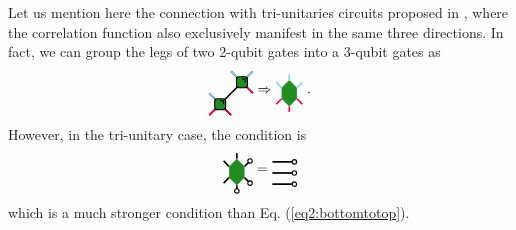 \documentclass[aps,prx,twocolumn,notitlepage,nofootinbib,nobalancelastpage]{revtex4-2}
\theoremstyle{break}
\newcommand{\1}{\mathbbm{1}}
\theoremstyle{plain}
\theoremstyle{plain}
\theoremstyle{plain}
\newcommand{\Wgategreen}[2]{
\draw[very thick] (#1-0.5, #2 +0.5) -- (#1+0.5,#2-0.5);
\draw[very thick] (#1-0.5,#2-0.5) -- (#1+0.5,#2+0.5);
\draw[ thick, fill=mygreen, rounded corners=2pt] (#1-0.25,#2+0.25) rectangle (#1+0.25,#2-0.25);
\draw[thick] (#1,#2+0.15) -- (#1+0.15,#2+0.15) -- (#1+0.15,#2);
}
\newcommand{\MYcircle}[2]{
\draw[thick, fill=white] (#1,#2) circle (0.1cm); }
\begin{document}
Let us mention here the connection with tri-unitaries circuits proposed in \cite{jonay2021triunitary}, where the correlation function also exclusively manifest in the same three directions. In fact, we can group the legs of two 2-qubit gates into a 3-qubit gates as
\begin{equation}
\begin{tikzpicture}[baseline=(current bounding box.center), scale=0.55]
    \Wgategreen{0}{0}
    \Wgategreen{-1}{-1}
    \draw[red!70!magenta,very thick] (-1.25,-1.25)--(-1.5,-1.5);
    \draw[red!70!magenta,very thick] (-0.75,-1.25)--(-0.5,-1.5);
    \draw[red!70!magenta,very thick] (0.25,-0.25)--(0.5,-0.5);
    \draw[skyblue, very thick] (-1.25,-0.75) -- (-1.5,-0.5);
    \draw[skyblue, very thick](-0.25,0.25) -- (-0.5,0.5);
    \draw[skyblue, very thick](0.25,0.25) -- (0.5,0.5);
\end{tikzpicture}
\Rightarrow
\begin{tikzpicture}[baseline=(current bounding box.center), scale=0.55]
 \fill[mygreen] (0,0) -- (0.35,0.35) -- (0.35,0.85) -- (0,1.2) -- (-0.35,0.85) -- (-0.35,0.35) -- cycle;
 \draw[red!70!magenta,very thick](0,0)--(0,-0.25);
 \draw[red!70!magenta,very thick](0.35,0.35)--(0.6,0.1);
 \draw[red!70!magenta,very thick](-0.35,0.35)--(-0.6,0.1);
 \draw[skyblue, very thick](0,1.2)--(0,1.45);
 \draw[skyblue, very thick](0.35,0.85) -- (0.6,1.1);
 \draw[skyblue, very thick](-0.35,0.85) -- (-0.6,1.1);
\end{tikzpicture}\; .
\end{equation}
However, in the tri-unitary case, the condition is
\begin{equation}
\begin{tikzpicture}[baseline=(current bounding box.center), scale=0.55]
 \fill[mygreen] (0,0) -- (0.35,0.35) -- (0.35,0.85) -- (0,1.2) -- (-0.35,0.85) -- (-0.35,0.35) -- cycle;
 \draw[very thick](0,0)--(0,-0.25);
 \draw[very thick](0.35,0.35)--(0.6,0.1);
 \draw[very thick](-0.35,0.35)--(-0.6,0.1);
 \draw[very thick](0,1.2)--(0,1.45);
 \draw[very thick](0.35,0.85) -- (0.6,1.1);
 \draw[very thick](-0.35,0.85) -- (-0.6,1.1);
 \MYcircle{0.6}{0.1}
 \MYcircle{0}{-0.25}
 \MYcircle{0.6}{1.1}
\end{tikzpicture}
=
\begin{tikzpicture}[baseline=(current bounding box.center), scale=0.55]

\draw[very thick](-0.5,1)--(0.5,1);
\draw[very thick](-0.5,0.5)--(0.5,0.5);
\draw[very thick](-0.5,0)--(0.5,0);
\MYcircle{0.5}{1}
\MYcircle{0.5}{0.5}
\MYcircle{0.5}{0}
\end{tikzpicture}
\end{equation}
which is a much stronger condition than Eq. (\ref{eq2:bottomtotop}).
\end{document}
